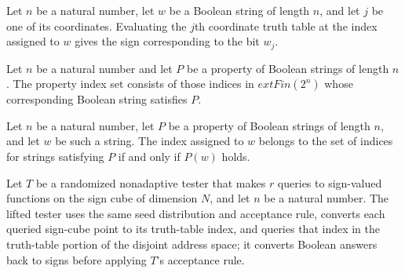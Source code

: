 \begin{theorem}
\label{FABL.coordinateTruthTable_apply_index}
\leanok
{}
Let $n$ be a natural number, let $w$ be a Boolean string of length $n$, and let $j$ be
one of its coordinates. Evaluating the $j$th coordinate truth table at the index
assigned to $w$ gives the sign corresponding to the bit $w_j$.
\end{theorem}

\begin{definition}
\label{FABL.propertyIndexSet}
\leanok
{}
Let $n$ be a natural number and let $P$ be a property of Boolean strings of length $n$.
The property index set consists of those indices in $	ext{Fin}(2^n)$ whose corresponding
Boolean string satisfies $P$.
\end{definition}

\begin{theorem}
\label{FABL.mem_propertyIndexSet}
\leanok
{}
Let $n$ be a natural number, let $P$ be a property of Boolean strings of length $n$, and
let $w$ be such a string. The index assigned to $w$ belongs to the set of indices for
strings satisfying $P$ if and only if $P(w)$ holds.
\end{theorem}

\begin{definition}
\label{FABL.boolTruthTableLiftTester}
\leanok
{}
Let $T$ be a randomized nonadaptive tester that makes $r$ queries to sign-valued
functions on the sign cube of dimension $N$, and let $n$ be a natural number. The lifted
tester uses the same seed distribution and acceptance rule, converts each queried
sign-cube point to its truth-table index, and queries that index in the truth-table
portion of the disjoint address space; it converts Boolean answers back to signs before
applying $T$'s acceptance rule.
\end{definition}

